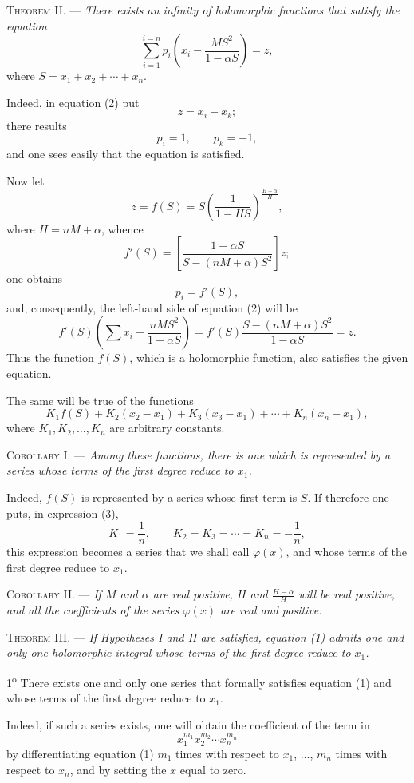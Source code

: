 \documentclass[11pt]{article}
\begin{document}
\noindent\textsc{Theorem II.} --- \emph{There exists an infinity of holomorphic functions that satisfy the equation}
\begin{equation*}\tag{2}
\sum_{i=1}^{i=n}p_i\left(x_i-\frac{MS^2}{1-\alpha S}\right)=z,
\end{equation*}
where $S=x_1+x_2+\cdots+x_n$.

Indeed, in equation (2) put
\[
z=x_i-x_k;
\]
there results
\[
p_i=1,\qquad p_k=-1,
\]
and one sees easily that the equation is satisfied.

Now let
\[
z=f(S)=S\left(\frac{1}{1-HS}\right)^{\frac{H-\alpha}{H}},
\]
where $H=nM+\alpha$, whence
\[
f'(S)=\left[\frac{1-\alpha S}{S-(nM+\alpha)S^2}\right]z;
\]
one obtains
\[
p_i=f'(S),
\]
and, consequently, the left-hand side of equation (2) will be
\[
f'(S)\left(\sum x_i-\frac{nMS^2}{1-\alpha S}\right)
=f'(S)\frac{S-(nM+\alpha)S^2}{1-\alpha S}=z.
\]
Thus the function $f(S)$, which is a holomorphic function, also satisfies the given equation.

The same will be true of the functions
\begin{equation*}\tag{3}
K_1f(S)+K_2(x_2-x_1)+K_3(x_3-x_1)+\cdots+K_n(x_n-x_1),
\end{equation*}
where $K_1,K_2,\ldots,K_n$ are arbitrary constants.

\noindent\textsc{Corollary I.} --- \emph{Among these functions, there is one which is represented by a series whose terms of the first degree reduce to $x_1$.}

Indeed, $f(S)$ is represented by a series whose first term is $S$.
If therefore one puts, in expression (3),
\[
K_1=\frac1n,\qquad K_2=K_3=\cdots=K_n=-\frac1n,
\]
this expression becomes a series that we shall call $\varphi(x)$, and whose terms of the first degree reduce to $x_1$.

\noindent\textsc{Corollary II.} --- \emph{If $M$ and $\alpha$ are real positive, $H$ and $\frac{H-\alpha}{H}$ will be real positive, and all the coefficients of the series $\varphi(x)$ are real and positive.}

\noindent\textsc{Theorem III.} --- \emph{If Hypotheses I and II are satisfied, equation (1) admits one and only one holomorphic integral whose terms of the first degree reduce to $x_1$.}

1\textsuperscript{o} There exists one and only one series that formally satisfies equation (1) and whose terms of the first degree reduce to $x_1$.

Indeed, if such a series exists, one will obtain the coefficient of the term in
\[
x_1^{m_1}x_2^{m_2}\cdots x_n^{m_n}
\]
by differentiating equation (1) $m_1$ times with respect to $x_1$, $\ldots$, $m_n$ times with respect to $x_n$, and by setting the $x$ equal to zero.
\end{document}
